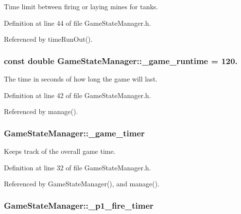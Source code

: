 Time limit between firing or laying mines for tanks. 



Definition at line 44 of file Game\-State\-Manager.\-h.



Referenced by time\-Run\-Out().

\hypertarget{classGameStateManager_a225d7168ceade083143153748bd55264}{
\subsubsection[{\-\_\-game\-\_\-runtime}]{\setlength{\rightskip}{0pt plus 5cm}const double Game\-State\-Manager\-::\-\_\-game\-\_\-runtime = 120.\hspace{0.3cm}{\ttfamily [private]}}}\label{classGameStateManager_a225d7168ceade083143153748bd55264}


The time in seconds of how long the game will last. 



Definition at line 42 of file Game\-State\-Manager.\-h.



Referenced by manage().

\hypertarget{classGameStateManager_a059c0be895a3ed3632257fbeb65b86d9}{
\subsubsection[{\-\_\-game\-\_\-timer}]{ Game\-State\-Manager\-::\-\_\-game\-\_\-timer\hspace{0.3cm}{\ttfamily [private]}}}\label{classGameStateManager_a059c0be895a3ed3632257fbeb65b86d9}


Keeps track of the overall game time. 



Definition at line 32 of file Game\-State\-Manager.\-h.



Referenced by Game\-State\-Manager(), and manage().

\hypertarget{classGameStateManager_a56b5da52f57018c53a29ee4adef4acff}{
\subsubsection[{\-\_\-p1\-\_\-fire\-\_\-timer}]{ Game\-State\-Manager\-::\-\_\-p1\-\_\-fire\-\_\-timer\hspace{0.3cm}{\ttfamily [private]}}}\label{classGameStateManager_a56b5da52f57018c53a29ee4adef4acff}


